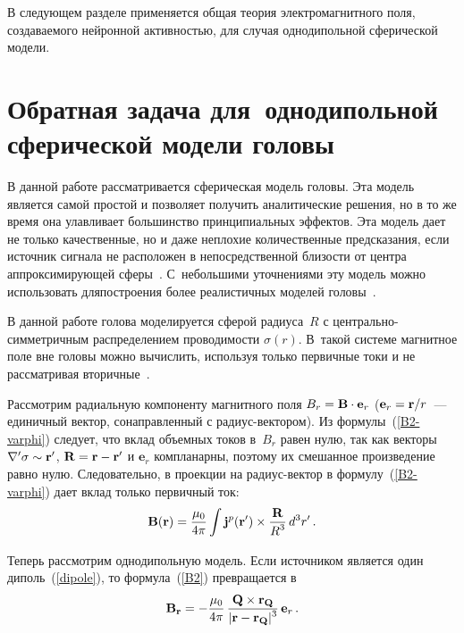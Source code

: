 \begin{multicols}{2}
В следующем разделе применяется общая тео\-рия электромагнитного поля,
создаваемого нейронной активностью, для случая однодипольной
сферической модели.

\section{Обратная задача для~однодипольной сферической модели головы}

В данной работе рассматривается сферическая модель головы. Эта
модель является самой прос\-той и позволяет получить аналитические
решения, но в то же время она улавливает большинство принципиальных
эффектов. Эта модель дает не только качественные, но и даже неплохие
количественные\linebreak
 предсказания, если источник сигнала не расположен в
непосредственной близости от центра аппроксимирующей сферы~\cite{whysphermodel}.
С~небольшими уточнениями эту модель можно
использовать для\linebreak постро\-ения более реалистичных моделей головы~\cite{hamalainen85}.

В данной работе голова моделируется сферой радиуса~$R$ с
цент\-раль\-но-сим\-мет\-рич\-ным распределением проводимости $\sigma(r)$.
В~такой сис\-те\-ме магнитное поле вне головы можно вычислить, используя
только первичные токи и не рассматривая вторичные~\cite{hamalainen93}.

Рассмотрим радиальную компоненту магнитного поля $B_r \hm= \mathbf{B}
\cdot \mathbf{e}_r$ ($\mathbf{e}_r \hm= \mathbf{r}/r$~--- единичный
вектор, сонаправленный с ра\-ди\-ус-век\-то\-ром). Из формулы~(\ref{B2-varphi})
следует, что вклад объемных токов в~$B_r$ равен
нулю, так как векторы $\nabla' \sigma \hm\sim \mathbf{r'}$, $\mathbf{R}
\hm= \mathbf{r} \hm- \mathbf{r'}$ и  $\mathbf{e}_r$ компланарны, поэтому
их смешанное произведение равно нулю. Следовательно, в проекции на
ра\-ди\-ус-век\-тор в формулу~(\ref{B2-varphi}) дает вклад только
первичный ток:
\begin{equation}
\label{B2}
\mathbf{B(r)} = \displaystyle\frac{\displaystyle \mu_0\mathstrut}{\displaystyle 4 \pi\mathstrut} \int  \mathbf{j}^p \mathbf{(r')}  \times
\displaystyle\frac{\displaystyle \mathbf{R}\mathstrut}{\displaystyle R^3\mathstrut} \, d^3 r' \,.
\end{equation}

Теперь рассмотрим однодипольную модель. Если источником является один диполь~(\ref{dipole}),
то формула~(\ref{B2}) превращается в
\begin{equation}
\label{Bdipole}
\mathbf{B_r}=-\displaystyle\frac{\displaystyle \mu_0\mathstrut}{\displaystyle 4\pi\mathstrut}\,
\displaystyle\frac{\displaystyle  \mathbf{Q} \times \mathbf{r_Q}\mathstrut}{\displaystyle  |\mathbf{r} - \mathbf{r_Q}|^3\mathstrut} \,\mathbf{e}_r \,.
\end{equation}




\end{multicols}
